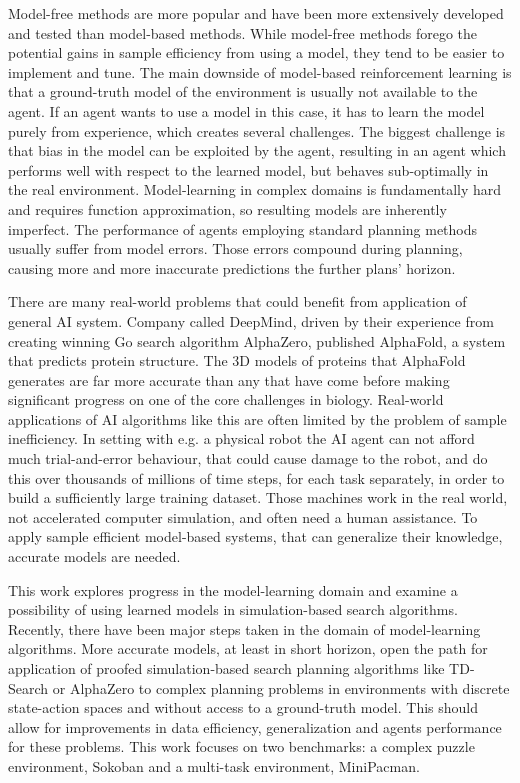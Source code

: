 Model-free methods are more popular and have been more extensively developed and tested than model-based methods. While model-free methods forego the potential gains in sample efficiency from using a model, they tend to be easier to implement and tune. The main downside of model-based reinforcement learning is that a ground-truth model of the environment is usually not available to the agent. If an agent wants to use a model in this case, it has to learn the model purely from experience, which creates several challenges. The biggest challenge is that bias in the model can be exploited by the agent, resulting in an agent which performs well with respect to the learned model, but behaves sub-optimally in the real environment. Model-learning in complex domains is fundamentally hard and requires function approximation, so resulting models are inherently imperfect. The performance of agents employing standard planning methods usually suffer from model errors. Those errors compound during planning, causing more and more inaccurate predictions the further plans' horizon.

There are many real-world problems that could benefit from application of general AI system. Company called DeepMind, driven by their experience from creating winning Go search algorithm AlphaZero\cite{Algo.AlphaZero}, published AlphaFold\cite{Algo.AlphaFold}, a system that predicts protein structure. The 3D models of proteins that AlphaFold generates are far more accurate than any that have come before making significant progress on one of the core challenges in biology. Real-world applications of AI algorithms like this are often limited by the problem of sample inefficiency. In setting with e.g. a physical robot the AI agent can not afford much trial-and-error behaviour, that could cause damage to the robot, and do this over thousands of millions of time steps, for each task separately, in order to build a sufficiently large training dataset. Those machines work in the real world, not accelerated computer simulation, and often need a human assistance. To apply sample efficient model-based systems, that can generalize their knowledge, accurate models are needed.

This work explores progress in the model-learning domain and examine a possibility of using learned models in simulation-based search algorithms. Recently, there have been major steps taken in the domain of model-learning algorithms\cite{Algo.RecurrentEnvSim}\cite{Algo.JointFrameRewardPrediction}\cite{Algo.FastGenerativeModels}\cite{Algo.PlaNet}. More accurate models, at least in short horizon, open the path for application of proofed simulation-based search planning algorithms like TD-Search\cite{Algo.TDSearch} or AlphaZero\cite{Algo.AlphaZero} to complex planning problems in environments with discrete state-action spaces and without access to a ground-truth model. This should allow for improvements in data efficiency, generalization and agents performance for these problems. This work focuses on two benchmarks: a complex puzzle environment, Sokoban and a multi-task environment, MiniPacman.
